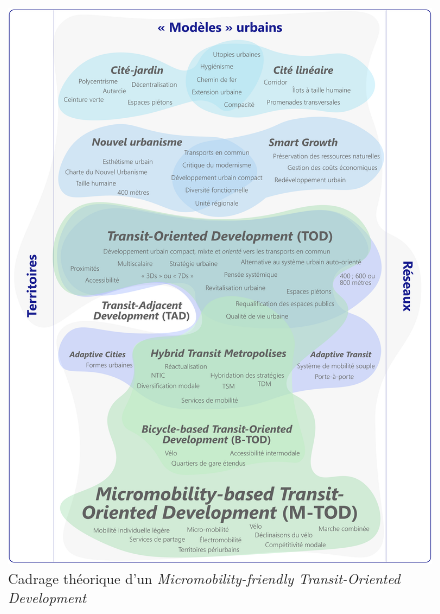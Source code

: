 \begin{refsegment}
\begin{figure}[h!]\vspace*{4pt}
        \caption*{Cadrage théorique d'un \textsl{Micromobility-friendly Transit-Oriented Development}}
        \label{graphical-abstract-chap1}
        \centerline{\includegraphics[width=1\columnwidth]{src/Figures/Graphical-abstract/FR_Graphical_abstract_chap1.pdf}}
        \vspace{5pt}
    \end{figure}
    

\end{refsegment}
